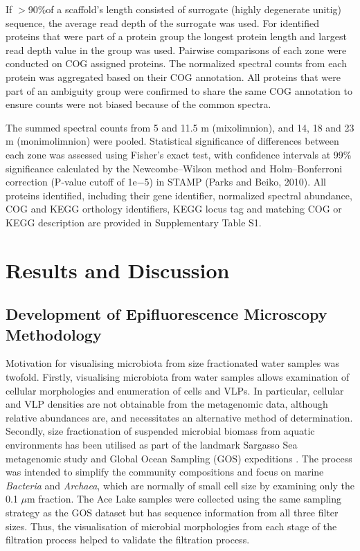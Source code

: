 If $>$90\%of a scaffold’s length consisted of surrogate (highly degenerate unitig) sequence, the average read depth of the surrogate was used. 
For identified proteins that were part of a protein group the longest protein length and largest read depth value in the group was used. 
Pairwise comparisons of each zone were conducted on COG assigned proteins. 
The normalized spectral counts from each protein was aggregated based on their COG annotation. 
All proteins that were part of an ambiguity group were confirmed to share the same COG annotation to ensure counts were not biased because of the common spectra.

The summed spectral counts from 5 and 11.5 m (mixolimnion), and 14, 18 and 23 m (monimolimnion) were pooled. 
Statistical significance of differences between each zone was assessed using Fisher’s exact test, with confidence intervals at 99\% significance calculated by the Newcombe–Wilson method and Holm–Bonferroni correction (P-value cutoff of 1e$-$5) in STAMP (Parks and Beiko, 2010). 
All proteins identified, including their gene identifier, normalized spectral abundance, COG and KEGG orthology identifiers, KEGG locus tag and matching COG or KEGG description are provided in Supplementary Table S1.




\section{Results and Discussion}

\subsection[Epifluorescence Microscopy Methodology]{Development of Epifluorescence Microscopy Methodology}
Motivation for visualising microbiota from size fractionated water samples was twofold. 
Firstly, visualising microbiota from water samples allows examination of cellular morphologies and enumeration of cells and VLPs.
In particular, cellular and VLP densities are not obtainable from the metagenomic data, although relative abundances are, and necessitates an alternative method of determination.
Secondly, size fractionation of suspended microbial biomass from aquatic environments has been utilised as part of the landmark Sargasso Sea metagenomic study \cite{Venter2004} and Global Ocean Sampling (GOS) expeditions \cite{Rusch2007}.
The process was intended to simplify the community compositions and focus on marine \textit{Bacteria} and \textit{Archaea}, which are normally of small cell size by examining only the 0.1 $\mu$m fraction.
The Ace Lake samples were collected using the same sampling strategy as the GOS dataset but has sequence information from all three filter sizes. 
Thus, the visualisation of microbial morphologies from each stage of the filtration process helped to validate the filtration process.

